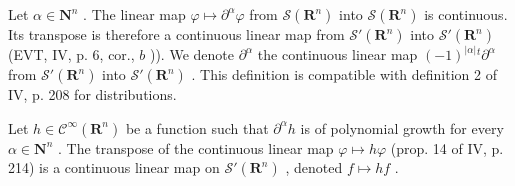 Let \(\alpha \in \mathbf{N}^n\) . The linear map \(\varphi \mapsto \partial^\alpha \varphi\) from \(\mathcal{S}(\mathbf{R}^n)\) into \(\mathcal{S}(\mathbf{R}^n)\) is continuous. Its transpose is therefore a continuous linear map from \(\mathcal{S}'(\mathbf{R}^n)\) into \(\mathcal{S}'(\mathbf{R}^n)\) (EVT, IV, p. 6, cor., \(b\) )). We denote \(\partial^\alpha\) the continuous linear map \((-1)^{|\alpha|}{}^{t}\partial^\alpha\) from \(\mathcal{S}'(\mathbf{R}^n)\) into \(\mathcal{S}'(\mathbf{R}^n)\) . This definition is compatible with definition 2 of IV, p. 208 for distributions.

Let \(h \in \mathcal{C}^{\infty}(\mathbf{R}^{n})\) be a function such that \(\partial^{\alpha}h\) is of polynomial growth for every \(\alpha \in \mathbf{N}^{n}\) . The transpose of the continuous linear map \(\varphi \mapsto h\varphi\) (prop. 14 of IV, p. 214) is a continuous linear map on \(\mathcal{S}'(\mathbf{R}^{n})\) , denoted \(f \mapsto hf\) .
\relax{}
